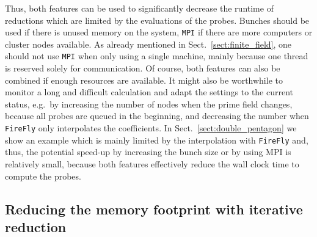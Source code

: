 \documentclass[11pt,a4paper,DIV=11,numbers=noenddot,parskip=half]{scrartcl}
\newcommand{\code}[1]{\texttt{#1}}
\newcommand*{\firefly}{\code{FireFly}}
\newcommand*{\mpi}{\code{MPI}}
\begin{document}
Thus, both features can be used to significantly decrease the runtime of reductions which are limited by the evaluations of the probes.
Bunches should be used if there is unused memory on the system, \mpi{} if there are more computers or cluster nodes available.
As already mentioned in Sect.~\ref{sect:finite_field}, one should not use \mpi{} when only using a single machine, mainly because one thread is reserved solely for communication.
Of course, both features can also be combined if enough resources are available.
It might also be worthwhile to monitor a long and difficult calculation and adapt the settings to the current status, e.g.\ by increasing the number of nodes when the prime field changes, because all probes are queued in the beginning, and decreasing the number when \firefly{} only interpolates the coefficients.
In Sect.~\ref{sect:double_pentagon} we show an example which is mainly limited by the interpolation with \firefly{} and, thus, the potential speed-up by increasing the bunch size or by using MPI is relatively small, because both features effectively reduce the wall clock time to compute the probes.


\subsection{Reducing the memory footprint with iterative reduction}
\label{sect:iterative_bench}
\end{document}
